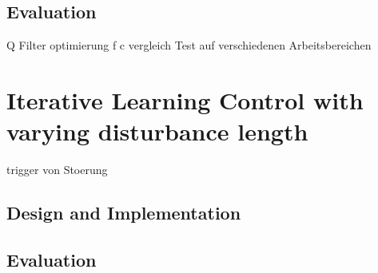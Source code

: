 \subsection{Evaluation}
Q Filter optimierung f c vergleich
Test auf verschiedenen Arbeitsbereichen
\section{Iterative Learning Control with varying disturbance length}
trigger von Stoerung
\subsection{Design and Implementation}
\subsection{Evaluation}
%
%
%

